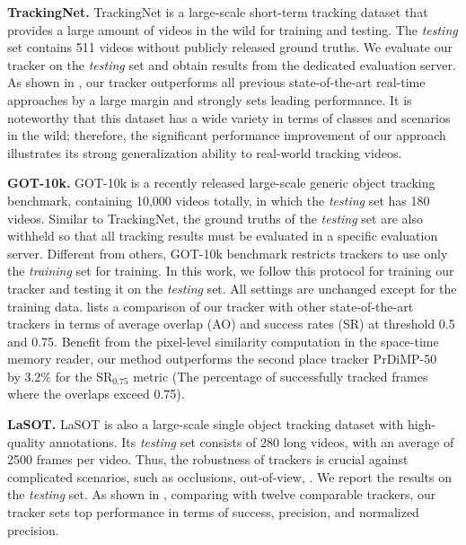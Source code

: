 \documentclass[final]{cvpr}
\begin{document}
\textbf{TrackingNet.}
TrackingNet \cite{muller2018trackingnet} is a large-scale short-term tracking dataset that provides a large amount of videos in the wild for training and testing.
The \textit{testing} set contains 511 videos without publicly released ground truths.
We evaluate our tracker on the \textit{testing} set and obtain results from the dedicated evaluation server.
As shown in , our tracker outperforms all previous state-of-the-art real-time approaches by a large margin and strongly sets leading performance.
It is noteworthy that this dataset has a wide variety in terms of classes and scenarios in the wild;
therefore, the significant performance improvement of our approach illustrates its strong generalization ability to real-world tracking videos.
\par
\textbf{GOT-10k.}
GOT-10k \cite{huang2019got} is a recently released large-scale generic object tracking benchmark, containing 10,000 videos totally, in which the \textit{testing} set has 180 videos.
Similar to TrackingNet, the ground truths of the \textit{testing} set are also withheld so that all tracking results must be evaluated in a specific evaluation server.
Different from others, GOT-10k benchmark restricts trackers to use only the \textit{training} set for training.
In this work, we follow this protocol for training our tracker and testing it on the \textit{testing} set.
All settings are unchanged except for the training data.
 lists a comparison of our tracker with other state-of-the-art trackers in terms of average overlap (AO) and success rates (SR) at threshold 0.5 and 0.75.
Benefit from the pixel-level similarity computation in the space-time memory reader, our method outperforms the second place tracker PrDiMP-50~\cite{danelljan2020probabilistic} by $3.2\%$ for the $\text{SR}_{0.75}$ metric (The percentage of successfully tracked frames where the overlaps exceed 0.75).
\par
\textbf{LaSOT.}
LaSOT \cite{fan2019lasot} is also a large-scale single object tracking dataset with high-quality annotations.
Its \textit{testing} set consists of 280 long videos, with an average of 2500 frames per video.
Thus, the robustness of trackers is crucial against complicated scenarios, such as occlusions, out-of-view, \etc.
We report the results on the \textit{testing} set.
As shown in , comparing with twelve comparable trackers, our tracker sets top performance in terms of success, precision, and normalized precision.
\end{document}
